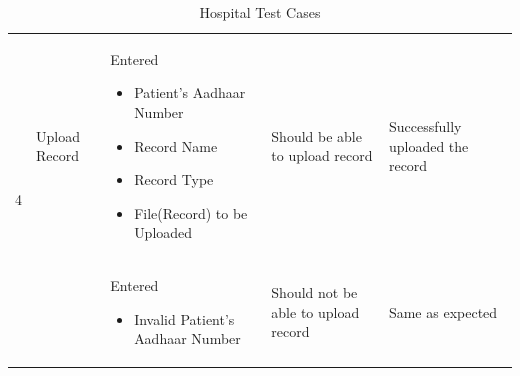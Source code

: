\begin{table}[h!]
\begin{tabular}{|p{.65cm}|p{2.5cm}|p{4cm}|p{3cm}|p{3.5cm}|}
	    
		\multirow{2}{1em}{\scriptsize4} & \scriptsize Upload Record & \scriptsize Entered	\begin{itemize}
		\vspace{-5mm}
		    \item Patient's Aadhaar Number  \vspace{-5mm}
		    \item Record Name \vspace{-5mm}
		    \item Record Type \vspace{-5mm}
		    \item File(Record) to be Uploaded
		\end{itemize} & \scriptsize Should be able to upload record & \scriptsize Successfully uploaded the record\\
		& & \scriptsize\vspace{-5mm} Entered	\begin{itemize}
		\vspace{-5mm}
		    \item Invalid Patient's Aadhaar Number  
		\end{itemize} & \scriptsize Should not be able to upload\vspace{-5mm}  record & \scriptsize Same as expected\\ 
		\hline
	\end{tabular}
	\caption{Hospital Test Cases}
\end{table}

